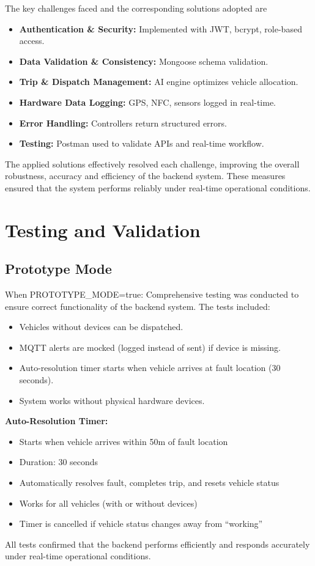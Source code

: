 The key challenges faced and the corresponding solutions adopted are
\begin{itemize}
    \item \textbf{Authentication \& Security:} Implemented with JWT, bcrypt, role-based access.
    \item \textbf{Data Validation \& Consistency:} Mongoose schema validation.
    \item \textbf{Trip \& Dispatch Management:} AI engine optimizes vehicle allocation.
    \item \textbf{Hardware Data Logging:} GPS, NFC, sensors logged in real-time.
    \item \textbf{Error Handling:} Controllers return structured errors.
    \item \textbf{Testing:} Postman used to validate APIs and real-time workflow.
\end{itemize}

The applied solutions effectively resolved each challenge, improving the overall robustness, accuracy and efficiency of the backend system. These measures ensured that the system performs reliably under real-time operational conditions.

\section{Testing and Validation}

\subsection{Prototype Mode}
When PROTOTYPE\_MODE=true:
Comprehensive testing was conducted to ensure correct functionality of the backend system. The tests included:
\begin{itemize}
    \item Vehicles without devices can be dispatched.
    \item MQTT alerts are mocked (logged instead of sent) if device is missing.
    \item Auto-resolution timer starts when vehicle arrives at fault location (30 seconds).
    \item System works without physical hardware devices.
\end{itemize}

\textbf{Auto-Resolution Timer:}
\begin{itemize}
    \item Starts when vehicle arrives within 50m of fault location
    \item Duration: 30 seconds
    \item Automatically resolves fault, completes trip, and resets vehicle status
    \item Works for all vehicles (with or without devices)
    \item Timer is cancelled if vehicle status changes away from ``working''
\end{itemize}
All tests confirmed that the backend performs efficiently and responds accurately under real-time operational conditions.

